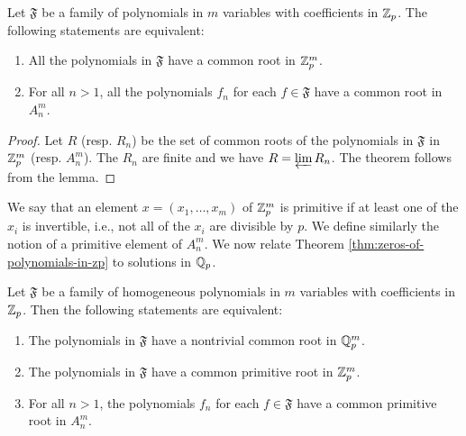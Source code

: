 \begin{theoremx}\label{thm:zeros-of-polynomials-in-zp}
    Let \(\mathfrak{F}\) be a family of polynomials in \(m\) variables with coefficients in \(\mathbb{Z}_p\). The following statements are equivalent:

    \smallskip

    \begin{enumerate}[nosep, label=(\alph*)]
        \item All the polynomials in \(\mathfrak{F}\) have a common root in \(\mathbb{Z}_p^m\).
        \item For all \(n > 1\), all the polynomials \(f_n\) for each \(f \in \mathfrak{F}\) have a common root in \(A_n^m\).
    \end{enumerate}
\end{theoremx}

\begin{proof}
    Let \(R\) (resp. \(R_n\)) be the set of common roots of the polynomials in \(\mathfrak{F}\) in \(\mathbb{Z}_p^m\) (resp. \(A_n^m\)). The \(R_n\) are finite and we have \(R = \varprojlim R_n\). The theorem follows from the lemma.
\end{proof}

We say that an element \(x = (x_1, \dots, x_m)\) of \(\mathbb{Z}_p^m\) is primitive if at least one of the \(x_i\) is invertible, i.e., not all of the \(x_i\) are divisible by \(p\). We define similarly the notion of a primitive element of \(A_n^m\). We now relate Theorem \ref{thm:zeros-of-polynomials-in-zp} to solutions in \(\mathbb{Q}_p\).

\begin{theoremx}\label{thm:zeros-of-polynomials-in-qp-family}
    Let \(\mathfrak{F}\) be a family of homogeneous polynomials in \(m\) variables with coefficients in \(\mathbb{Z}_p\). Then the following statements are equivalent:

    \smallskip

    \begin{enumerate}[nosep, label=(\alph*)]
        \item The polynomials in \(\mathfrak{F}\) have a nontrivial common root in \(\mathbb{Q}_p^m\).
        \item The polynomials in \(\mathfrak{F}\) have a common primitive root in \(\mathbb{Z}_p^m\).
        \item For all \(n > 1\), the polynomials \(f_n\) for each \(f \in \mathfrak{F}\) have a common primitive root in \(A_n^m\).
    \end{enumerate}
\end{theoremx}

